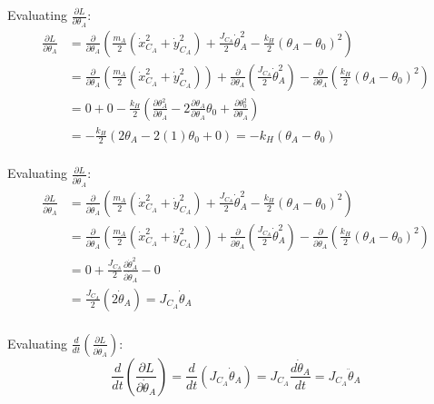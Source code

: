 \documentclass[titlepage]{article}
\begin{document}
Evaluating $\frac{\partial L}{\partial\theta_A}$:
\begin{equation}
	\begin{split}
		\frac{\partial L}{\partial\theta_A}&=\frac{\partial}{\partial\theta_A}\left(\frac{m_A}{2}\left(\dot{x}_{C_A}^2+\dot{y}_{C_A}^2\right)+\frac{J_{C_A}}{2}\dot{\theta}_A^2-\frac{k_H}{2}(\theta_A-\theta_0)^2\right) \\
		&=\frac{\partial}{\partial\theta_A}\left(\frac{m_A}{2}\left(\dot{x}_{C_A}^2+\dot{y}_{C_A}^2\right)\right)+\frac{\partial}{\partial\theta_A}\left(\frac{J_{C_A}}{2}\dot{\theta}_A^2\right)-\frac{\partial}{\partial\theta_A}\left(\frac{k_H}{2}(\theta_A-\theta_0)^2\right) \\
		&=0+0-\frac{k_H}{2}\left(\frac{\partial\theta_A^2}{\partial\theta_A}-2\frac{\partial\theta_A}{\partial\theta_A}\theta_0+\frac{\partial\theta_0^2}{\partial\theta_A}\right) \\
		&=-\frac{k_H}{2}\left(2\theta_A-2(1)\theta_0+0\right)=-k_H\left(\theta_A-\theta_0\right) \\
	\end{split}
\end{equation}

Evaluating $\frac{\partial L}{\partial\dot{\theta}_A}$:
\begin{equation}
	\begin{split}
		\frac{\partial L}{\partial\dot{\theta}_A}&=\frac{\partial}{\partial\dot{\theta}_A}\left(\frac{m_A}{2}\left(\dot{x}_{C_A}^2+\dot{y}_{C_A}^2\right)+\frac{J_{C_A}}{2}\dot{\theta}_A^2-\frac{k_H}{2}(\theta_A-\theta_0)^2\right) \\
		&=\frac{\partial}{\partial\dot{\theta}_A}\left(\frac{m_A}{2}\left(\dot{x}_{C_A}^2+\dot{y}_{C_A}^2\right)\right)+\frac{\partial}{\partial\dot{\theta}_A}\left(\frac{J_{C_A}}{2}\dot{\theta}_A^2\right)-\frac{\partial}{\partial\dot{\theta}_A}\left(\frac{k_H}{2}(\theta_A-\theta_0)^2\right) \\
		&=0+\frac{J_{C_A}}{2}\frac{\partial\dot{\theta}_A^2}{\partial\dot{\theta}_A}-0 \\
		&=\frac{J_{C_A}}{2}\left(2\dot{\theta}_A\right)=J_{C_A}\dot{\theta}_A \\
	\end{split}
\end{equation}

Evaluating $\frac{d}{dt}\left(\frac{\partial L}{\partial\dot{\theta}_A}\right)$:
\begin{equation}
	\frac{d}{dt}\left(\frac{\partial L}{\partial\dot{\theta}_A}\right)=\frac{d}{dt}\left(J_{C_A}\dot{\theta}_A\right)=J_{C_A}\frac{d\dot{\theta}_A}{dt}=J_{C_A}\ddot{\theta}_A
\end{equation}
\end{document}
